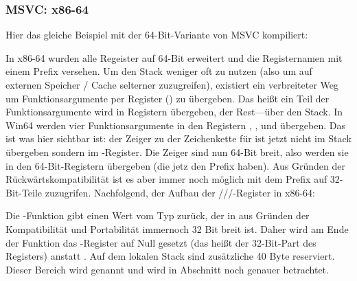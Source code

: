 \subsubsection{MSVC: x86-64}

Hier das gleiche Beispiel mit der 64-Bit-Variante von MSVC kompiliert:




In x86-64 wurden alle Regeister auf 64-Bit erweitert und die Registernamen mit einem Prefix versehen.
Um den Stack weniger oft zu nutzen (also um auf externen Speicher / Cache selterner zuzugreifen), existiert
ein verbreiteter Weg um Funktionsargumente per Register ()  zu übergeben.
Das heißt ein Teil der Funktionsargumente wird in Registern übergeben, der Rest---über den Stack.
In Win64 werden vier Funktionsargumente in den Registern \RCX, \RDX,  und  übergeben.
Das ist was hier sichtbar ist: der Zeiger zu der Zeichenkette für \printf ist jetzt nicht im Stack übergeben sondern im \RCX-Register.
Die Zeiger sind nun 64-Bit breit, also werden sie in den 64-Bit-Registern übergeben (die jetz den Prefix haben).
Aus Gründen der Rückwärtskompatibilität ist es aber immer noch möglich mit dem Prefix auf 32-Bit-Teile zuzugrifen.
Nachfolgend, der Aufbau der \RAX/\EAX/\AX/\AL-Register in x86-64:


Die \main-Funktion gibt einen Wert vom Typ \Tint{} zurück, der in \CCpp aus Gründen der Kompatibilität und
Portabilität immernoch 32 Bit breit ist. Daher wird am Ende der Funktion das \EAX-Register auf Null gesetzt
(das heißt der 32-Bit-Part des Registers) anstatt \RAX{}.
Auf dem lokalen Stack sind zusätzliche 40 Byte reserviert.
Dieser Bereich wird  genannt und wird in Abschnitt  noch genauer betrachtet.
